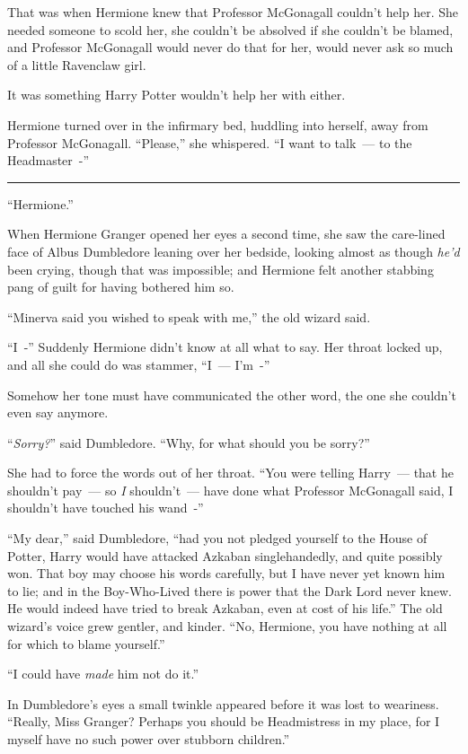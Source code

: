 That was when Hermione knew that Professor McGonagall couldn't help her. She needed someone to scold her, she couldn't be absolved if she couldn't be blamed, and Professor McGonagall would never do that for her, would never ask so much of a little Ravenclaw girl.

It was something Harry Potter wouldn't help her with either.

Hermione turned over in the infirmary bed, huddling into herself, away from Professor McGonagall. ``Please,'' she whispered. ``I want to talk~--- to the Headmaster~-''

\begin{center}\rule{3in}{0.4pt}\end{center}

``Hermione.''

When Hermione Granger opened her eyes a second time, she saw the care-lined face of Albus Dumbledore leaning over her bedside, looking almost as though \emph{he'd} been crying, though that was impossible; and Hermione felt another stabbing pang of guilt for having bothered him so.

``Minerva said you wished to speak with me,'' the old wizard said.

``I~-'' Suddenly Hermione didn't know at all what to say. Her throat locked up, and all she could do was stammer, ``I~--- I'm~-''

Somehow her tone must have communicated the other word, the one she couldn't even say anymore.

``\emph{Sorry?}'' said Dumbledore. ``Why, for what should you be sorry?''

She had to force the words out of her throat. ``You were telling Harry~--- that he shouldn't pay~--- so \emph{I} shouldn't~--- have done what Professor McGonagall said, I shouldn't have touched his wand~-''

``My dear,'' said Dumbledore, ``had you not pledged yourself to the House of Potter, Harry would have attacked Azkaban singlehandedly, and quite possibly won. That boy may choose his words carefully, but I have never yet known him to lie; and in the Boy-Who-Lived there is power that the Dark Lord never knew. He would indeed have tried to break Azkaban, even at cost of his life.'' The old wizard's voice grew gentler, and kinder. ``No, Hermione, you have nothing at all for which to blame yourself.''

``I could have \emph{made} him not do it.''

In Dumbledore's eyes a small twinkle appeared before it was lost to weariness. ``Really, Miss Granger? Perhaps you should be Headmistress in my place, for I myself have no such power over stubborn children.''

